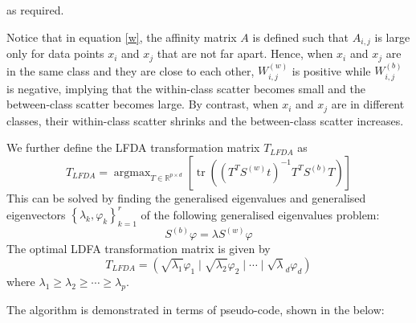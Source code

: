 \documentclass[a4paper,12pt]{article}
\begin{document}
as required.

Notice that in equation \ref{w}, the affinity matrix $A$ is defined such that $A_{i,j}$ is large only for data points $x_{i}$ and $x_{j}$ that are not far apart. Hence, when $x_{i}$ and $x_{j}$ are in the same class and they are close to each other, $W_{i, j}^{(w)}$ is positive while $W_{i, j}^{(b)}$ is negative, implying that the within-class scatter becomes small and the between-class scatter becomes large. By contrast, when $x_{i}$ and $x_{j}$ are in different classes, their within-class scatter shrinks and the between-class scatter increases. 

We further define the LFDA transformation matrix $T_{L F D A}$ as
\begin{equation*}
T_{L F D A}=\operatorname{argmax}_{T \in \mathbb{R}^{p \times d}}\left[\operatorname{tr}\left(\left(T^{T} S^{(w)} t\right)^{-1} T^{T} S^{(b)} T\right)\right]
\end{equation*}
This can be solved by finding the generalised eigenvalues and generalised eigenvectors $\left\{{\lambda}_{k}, {\varphi}_{k}\right\}_{k=1}^{r}$ of the following generalised eigenvalues problem:
\begin{equation} \label{lfda}
{S}^{(b)} {\varphi}={\lambda} {S}^{(w)} {\varphi}
\end{equation}
The optimal LDFA transformation matrix is given by
\begin{equation*}
T_{L F D A}=\left(\sqrt{{\lambda}_{1}} {\varphi}_{1}\mid\sqrt{{\lambda}_{2}} {\varphi}_{2}\mid \cdots\mid\sqrt{{\lambda}}_{d} {\varphi}_{d}\right)
\end{equation*}
where ${\lambda}_{1} \geq {\lambda}_{2} \geq \cdots \geq {\lambda}_{p}$.

The algorithm is demonstrated in terms of pseudo-code, shown in the below:
\end{document}
